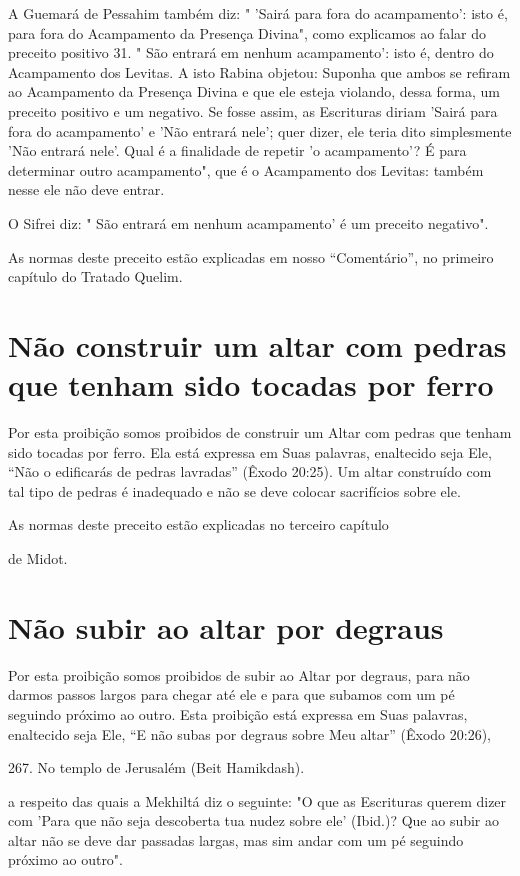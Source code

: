 A Guemará de Pessahim também diz: " 'Sairá para fora do acampa­mento':
isto é, para fora do Acampamento da Presença Divina", como explica­mos
ao falar do preceito positivo 31. " São entrará em nenhum acampamen­to':
isto é, dentro do Acampamento dos Levitas. A isto Rabina objetou:
Supo­nha que ambos se refiram ao Acampamento da Presença Divina e que
ele esteja violando, dessa forma, um preceito positivo e um negativo. Se
fosse assim, as Escrituras diriam 'Sairá para fora do acampamento' e
'Não entrará nele'; quer dizer, ele teria dito simplesmente 'Não entrará
nele'. Qual é a finalidade de re­petir 'o acampamento'? É para
determinar outro acampamento", que é o Acam­pamento dos Levitas: também
nesse ele não deve entrar.

O Sifrei diz: " São entrará em nenhum acampamento' é um precei­to
negativo".

As normas deste preceito estão explicadas em nosso ``Comentário'', no
primeiro capítulo do Tratado Quelim.


\section{Não construir um altar com pedras que tenham sido tocadas por ferro}


Por esta proibição somos proibidos de construir um Altar com pe­dras que
tenham sido tocadas por ferro. Ela está expressa em Suas palavras,
enal­tecido seja Ele, ``Não o edificarás de pedras lavradas'' (Êxodo
20:25). Um altar construído com tal tipo de pedras é inadequado e não se
deve colocar sacrifí­cios sobre ele.


As normas deste preceito estão explicadas no terceiro capítulo


de Midot.

\section{Não subir ao altar por degraus}

Por esta proibição somos proibidos de subir ao Altar por degraus, para
não darmos passos largos para chegar até ele e para que subamos com um
pé seguindo próximo ao outro. Esta proibição está expressa em Suas
palavras, enaltecido seja Ele, ``E não subas por degraus sobre Meu altar''
(Êxodo 20:26),

267. No templo de Jerusalém (Beit Hamikdash).

a respeito das quais a Mekhiltá diz o seguinte: "O que as Escrituras
querem di­zer com 'Para que não seja descoberta tua nudez sobre ele'
(Ibid.)? Que ao su­bir ao altar não se deve dar passadas largas, mas sim
andar com um pé seguindo próximo ao outro".

